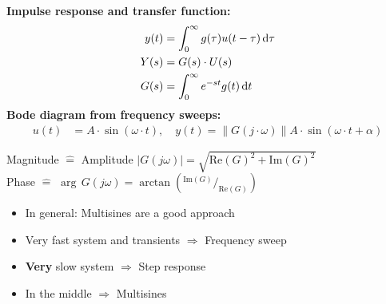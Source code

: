 \begin{tcolorbox}[colback=brown!5!white,colframe=brown!75!black,title=\textbf{Nonparametric and Frequency Domain Identification Models}]
\textbf{Impulse response and transfer function:}
\begin{align*}
	y(t) &= \int_{0}^{\infty} g(\tau) u(t-\tau) \, \mathrm{d} \tau \\
	Y(s) &= G(s)\cdot U(s) \\
	G(s) &= \int_{0}^{\infty} e^{-st} g(t) \, \mathrm{d} t 
\end{align*}
\textbf{Bode diagram from frequency sweeps:}
\begin{align*}
	u(t) &= A \cdot \sin(\omega \cdot t),\quad y(t) = \lVert G (j\cdot \omega )\rVert A \cdot \sin(\omega \cdot t + \alpha)
\end{align*}
\end{tcolorbox}

\begin{tcolorbox}[colback=brown!5!white,colframe=brown!75!black,title=\textbf{Bode Diagramm}]
	Magnitude $\widehat{=}$ Amplitude $|G(j\omega)|=\sqrt{\mathrm{Re}(G)^2+\mathrm{Im}(G)^2}$\\
	Phase $\widehat{=}$ $\arg \, G(j\omega)=\arctan\left( ^{\mathrm{Im}(G)}/_{\mathrm{Re}(G)}\right)$
  \end{tcolorbox}

  \begin{tcolorbox}[colback=brown!5!white,colframe=brown!75!black,title=\textbf{When to use what in frequency response}]
	\begin{itemize}
	\item In general: Multisines are a good approach
	\item Very fast system and transients $\Rightarrow$ Frequency sweep
	\item \textbf{Very} slow system $\Rightarrow$ Step response
	\item In the middle $\Rightarrow$ Multisines
	\end{itemize}
  \end{tcolorbox}



